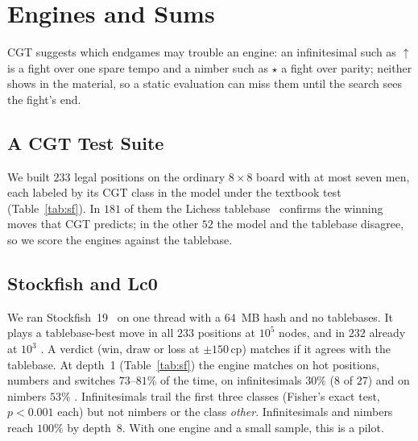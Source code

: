 \section{Engines and Sums}\label{sec:engines}

CGT suggests which endgames may trouble an engine: an infinitesimal such as ${\uparrow}$ is a fight over one
spare tempo and a nimber such as $\star$ a fight over parity; neither shows in the material, so a static
evaluation can miss them until the search sees the fight's end.

\subsection{A CGT Test Suite}

We built $233$ legal positions on the ordinary $8\times8$ board with at most seven men, each labeled by its CGT
class in the model under the textbook test (Table~\ref{tab:sf}). In $181$ of them the Lichess tablebase~\cite{LichessTB} confirms the winning moves
that CGT predicts; in the other $52$ the model and the tablebase disagree, so we score the engines against the
tablebase.

\subsection{Stockfish and Lc0}

We ran Stockfish~19~\cite{Stockfish} on one thread with a $64$~MB hash and no tablebases. It plays a tablebase-best move in all $233$
positions at $10^5$ nodes, and in $232$ already at $10^3$ . A verdict (win, draw or loss at $\pm150$\,cp) matches if it agrees with the tablebase. At depth~1
(Table~\ref{tab:sf}) the engine matches on hot positions, numbers and switches $73$--$81\%$ of the time, on
infinitesimals $30\%$ ($8$ of $27$) and on nimbers $53\%$ . Infinitesimals trail the first three classes
(Fisher's exact test, $p<0.001$ each) but not nimbers or the class \emph{other}. Infinitesimals and nimbers reach
$100\%$ by depth~8.
With one engine and a small sample, this is a pilot.

